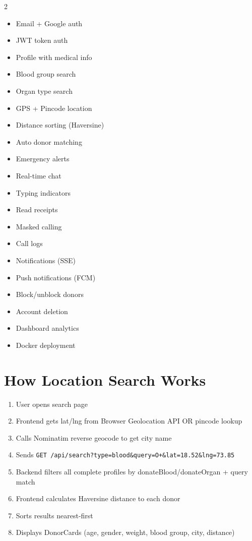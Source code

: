 \documentclass[10pt,a4paper]{article}
\begin{document}
\begin{multicols}{2}
\begin{itemize}
    \item Email + Google auth
    \item JWT token auth
    \item Profile with medical info
    \item Blood group search
    \item Organ type search
    \item GPS + Pincode location
    \item Distance sorting (Haversine)
    \item Auto donor matching
    \item Emergency alerts
    \item Real-time chat
    \item Typing indicators
    \item Read receipts
    \item Masked calling
    \item Call logs
    \item Notifications (SSE)
    \item Push notifications (FCM)
    \item Block/unblock donors
    \item Account deletion
    \item Dashboard analytics
    \item Docker deployment
\end{itemize}
\end{multicols}

\section{How Location Search Works}

\begin{enumerate}
    \item User opens search page
    \item Frontend gets lat/lng from Browser Geolocation API OR pincode lookup
    \item Calls Nominatim reverse geocode to get city name
    \item Sends \texttt{GET /api/search?type=blood\&query=O+\&lat=18.52\&lng=73.85}
    \item Backend filters all complete profiles by donateBlood/donateOrgan + query match
    \item Frontend calculates Haversine distance to each donor
    \item Sorts results nearest-first
    \item Displays DonorCards (age, gender, weight, blood group, city, distance)
\end{enumerate}
\end{document}
